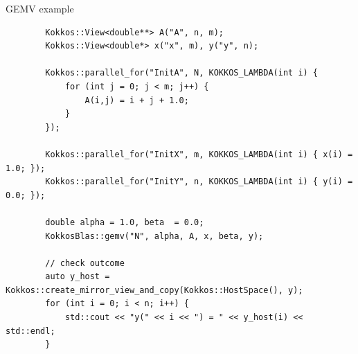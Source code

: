 \documentclass[
    aspectratio=169,
]{beamer}
\begin{document}
\begin{frame}[fragile]{GEMV example}
    \begin{verbatim}
        Kokkos::View<double**> A("A", n, m);
        Kokkos::View<double*> x("x", m), y("y", n);

        Kokkos::parallel_for("InitA", N, KOKKOS_LAMBDA(int i) {
            for (int j = 0; j < m; j++) {
                A(i,j) = i + j + 1.0;
            }
        });

        Kokkos::parallel_for("InitX", m, KOKKOS_LAMBDA(int i) { x(i) = 1.0; });
        Kokkos::parallel_for("InitY", n, KOKKOS_LAMBDA(int i) { y(i) = 0.0; });

        double alpha = 1.0, beta  = 0.0;
        KokkosBlas::gemv("N", alpha, A, x, beta, y);

        // check outcome
        auto y_host = Kokkos::create_mirror_view_and_copy(Kokkos::HostSpace(), y);
        for (int i = 0; i < n; i++) {
            std::cout << "y(" << i << ") = " << y_host(i) << std::endl;
        }
    \end{verbatim}
\end{frame}
\end{document}
